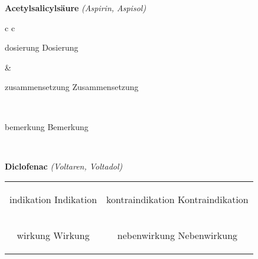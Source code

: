 \documentclass[12pt]{beamer}
\begin{document}
\begin{frame}{
    \textbf{Acetylsalicylsäure}
    \textit{(Aspirin, Aspisol)}
}
    \begin{tabular}{c c}
        \begin{beamercolorbox}[wd=\boxwidth\textwidth,ht=\boxheight\textheight,sep=1em]{dosierung}
        Dosierung
        \end{beamercolorbox} & 
        \begin{beamercolorbox}[wd=\boxwidth\textwidth,ht=\boxheight\textheight,sep=1em]{zusammensetzung}
        Zusammensetzung
        \end{beamercolorbox} \\
        \begin{beamercolorbox}[wd=\textwidth,ht=\boxheight\textheight,sep=1em]{bemerkung}
        Bemerkung
        \end{beamercolorbox} \\
    \end{tabular}
\end{frame}

\begin{frame}{
    \textbf{Diclofenac}
    \textit{(Voltaren, Voltadol)}
}
    \begin{tabular}{c c}
        \begin{beamercolorbox}[wd=\boxwidth\textwidth,ht=\boxheight\textheight,sep=1em]{indikation}
        Indikation
        \end{beamercolorbox} & 
        \begin{beamercolorbox}[wd=\boxwidth\textwidth,ht=\boxheight\textheight,sep=1em]{kontraindikation}
        Kontraindikation 
        \end{beamercolorbox} \\
        \begin{beamercolorbox}[wd=\boxwidth\textwidth,ht=\boxheight\textheight,sep=1em]{wirkung}
        Wirkung
        \end{beamercolorbox} & 
        \begin{beamercolorbox}[wd=\boxwidth\textwidth,ht=\boxheight\textheight,sep=1em]{nebenwirkung}
        Nebenwirkung
        \end{beamercolorbox} \\
    \end{tabular}
\end{frame}
\end{document}

